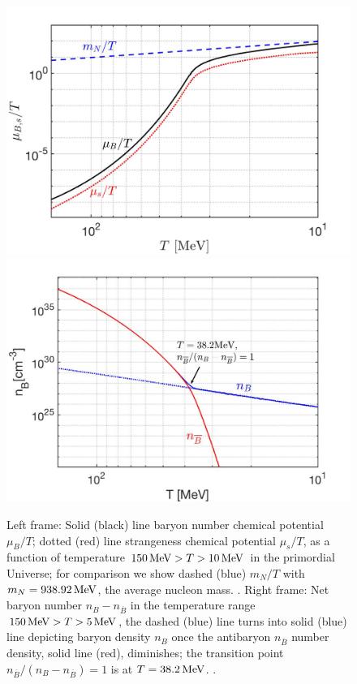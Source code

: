 \begin{figure}
\centerline{\includegraphics[width=0.50\linewidth]{./plots/New_Chemical_Potential_C.jpg}
\includegraphics[width=0.505\linewidth]{./plots/Baryon_Antibaryon_cm.jpg}}
\caption{Left frame: Solid (black) line baryon number chemical potential $\mu_B/T$; dotted (red) line strangeness chemical potential $\mu_s/T$, as a function of temperature $150\text{\,MeV}> T>10\text{\,MeV}$ in the primordial Universe; for comparison we show dashed (blue) $m_N/T $ with $m_N=938.92\text{\,MeV}$, the average nucleon mass. . 
 
{\color{black} Right frame: Net baryon number $n_{B}-n_{\overline{B}}$ in the temperature range $150\text{\,MeV}>T>5\text{\,MeV}$, the dashed (blue) line turns into solid (blue) line depicting baryon density $n_{B}$ once the antibaryon $n_{\overline B}$ number density, solid line (red), diminishes; the transition point $n_{\overline B}/(n_B-n_{\overline B})=1$ is at $T=38.2\text{\,MeV}$. . }
}
\label{Baryon:fig}
\end{figure}

